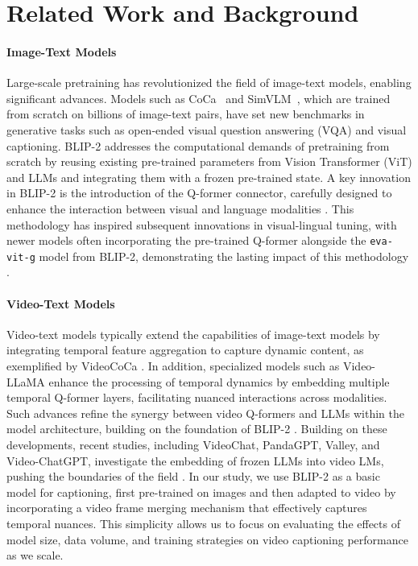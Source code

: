 \section{Related Work and Background}
\label{app:sec:related-work}
\paragraph{Image-Text Models}
Large-scale pretraining has revolutionized the field of image-text models, enabling significant advances. Models such as CoCa~\citep{yu2022coca} and SimVLM~\cite{wang2022simvlm}, which are trained from scratch on billions of image-text pairs, have set new benchmarks in generative tasks such as open-ended visual question answering (VQA) and visual captioning. BLIP-2 addresses the computational demands of pretraining from scratch by reusing existing pre-trained parameters from Vision Transformer (ViT) and LLMs and integrating them with a frozen pre-trained state. A key innovation in BLIP-2 is the introduction of the Q-former connector, carefully designed to enhance the interaction between visual and language modalities \citep{li2023blip}. This methodology has inspired subsequent innovations in visual-lingual tuning, with newer models often incorporating the pre-trained Q-former alongside the \texttt{eva-vit-g} model from BLIP-2, demonstrating the lasting impact of this methodology \citep{instructblip, zhu2023minigpt, yang2024cliperase, 2023videochat}.

\paragraph{Video-Text Models}
Video-text models typically extend the capabilities of image-text models by integrating temporal feature aggregation to capture dynamic content, as exemplified by VideoCoCa \citep{yan2022videotext}. In addition, specialized models such as Video-LLaMA enhance the processing of temporal dynamics by embedding multiple temporal Q-former layers, facilitating nuanced interactions across modalities. Such advances refine the synergy between video Q-formers and LLMs within the model architecture, building on the foundation of BLIP-2 \citep{damonlpsg2023videollama}. Building on these developments, recent studies, including VideoChat, PandaGPT, Valley, and Video-ChatGPT, investigate the embedding of frozen LLMs into video LMs, pushing the boundaries of the field \citep{2023videochat, su2023pandagpt, luo2023valley, Maaz2023VideoChatGPT}. In our study, we use BLIP-2 as a basic model for captioning, first pre-trained on images and then adapted to video by incorporating a video frame merging mechanism that effectively captures temporal nuances. This simplicity allows us to focus on evaluating the effects of model size, data volume, and training strategies on video captioning performance as we scale. 

